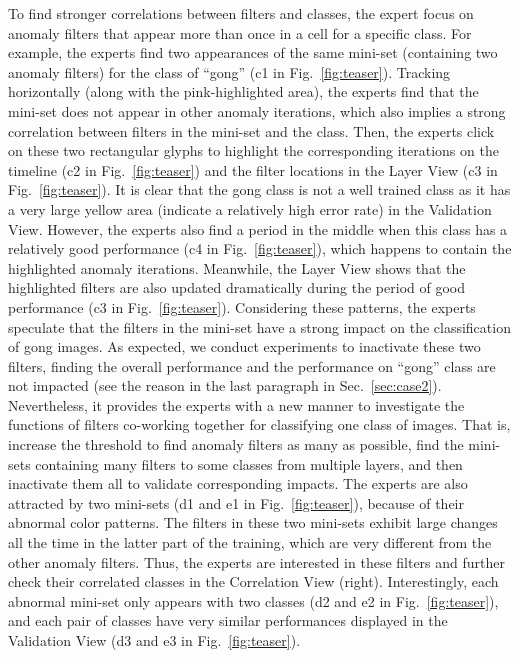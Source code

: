 \documentclass[format=acmsmall, review=false, screen=true]{acmart}
\begin{document}
To find stronger correlations between filters and classes, the expert focus on anomaly filters that appear more than once in a cell for a specific class.
For example, the experts find two appearances of the same mini-set (containing two anomaly filters) for the class of ``gong'' (c1 in Fig.~\ref{fig:teaser}).
Tracking horizontally (along with the pink-highlighted area), the experts find that the mini-set does not appear in other anomaly iterations, which also implies a strong correlation between filters in the mini-set and the class.
Then, the experts click on these two rectangular glyphs to highlight the corresponding iterations on the timeline (c2 in Fig.~\ref{fig:teaser}) and the filter locations in the Layer View (c3 in Fig.~\ref{fig:teaser}).
It is clear that the gong class is not a well trained class as it has a very large yellow area (indicate a relatively high error rate) in the Validation View.
However, the experts also find a period in the middle when this class has a relatively good performance (c4 in Fig.~\ref{fig:teaser}), which happens to contain the highlighted anomaly iterations.
Meanwhile, the Layer View shows that the highlighted filters are also updated dramatically during the period of good performance (c3 in Fig.~\ref{fig:teaser}).
Considering these patterns, the experts speculate that the filters in the mini-set have a strong impact on the classification of gong images.
As expected, we conduct experiments to inactivate these two filters, finding the overall performance and the performance on ``gong'' class are not impacted (see the reason in the last paragraph in Sec.~\ref{sec:case2}). Nevertheless, it provides the experts with a new manner to investigate the functions of filters co-working together for classifying one class of images. That is, increase the threshold to find anomaly filters as many as possible, find the mini-sets containing many filters to some classes from multiple layers, and then inactivate them all to validate corresponding impacts.
The experts are also attracted by two mini-sets (d1 and e1 in Fig.~\ref{fig:teaser}), because of their abnormal color patterns.
The filters in these two mini-sets exhibit large changes all the time in the latter part of the training, which are very different from the other anomaly filters.
Thus, the experts are interested in these filters and further check their correlated classes in the Correlation View (right).
Interestingly, each abnormal mini-set only appears with two classes (d2 and e2 in Fig.~\ref{fig:teaser}), and each pair of classes have very similar performances displayed in the Validation View (d3 and e3 in Fig.~\ref{fig:teaser}).
\end{document}

